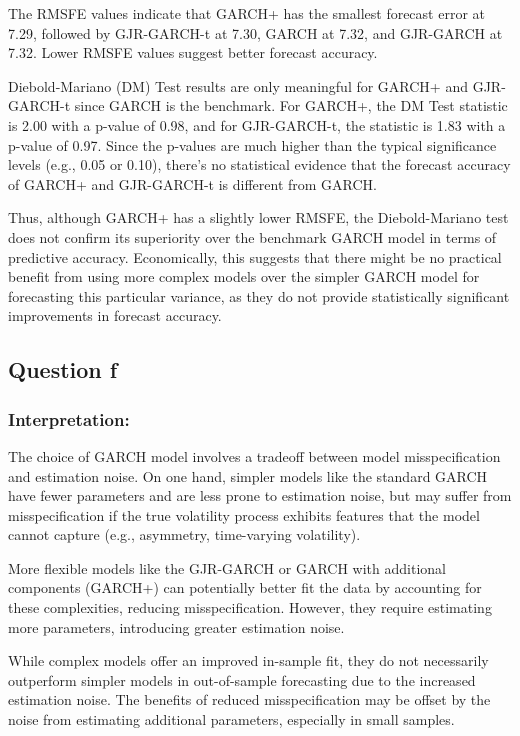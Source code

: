 \documentclass{article}
\begin{document}
The RMSFE values indicate that GARCH+ has the smallest forecast error at 7.29, followed by GJR-GARCH-t at 7.30, GARCH at 7.32, and GJR-GARCH at 7.32. Lower RMSFE values suggest better forecast accuracy.

Diebold-Mariano (DM) Test results are only meaningful for GARCH+ and GJR-GARCH-t since GARCH is the benchmark. For GARCH+, the DM Test statistic is 2.00 with a p-value of 0.98, and for GJR-GARCH-t, the statistic is 1.83 with a p-value of 0.97. Since the p-values are much higher than the typical significance levels (e.g., 0.05 or 0.10), there's no statistical evidence that the forecast accuracy of GARCH+ and GJR-GARCH-t is different from GARCH.

Thus, although GARCH+ has a slightly lower RMSFE, the Diebold-Mariano test does not confirm its superiority over the benchmark GARCH model in terms of predictive accuracy. Economically, this suggests that there might be no practical benefit from using more complex models over the simpler GARCH model for forecasting this particular variance, as they do not provide statistically significant improvements in forecast accuracy.

\subsection*{Question f}
\subsubsection*{Interpretation:}

The choice of GARCH model involves a tradeoff between model misspecification and estimation noise. On one hand, simpler models like the standard GARCH have fewer parameters and are less prone to estimation noise, but may suffer from misspecification if the true volatility process exhibits features that the model cannot capture (e.g., asymmetry, time-varying volatility).

More flexible models like the GJR-GARCH or GARCH with additional components (GARCH+) can potentially better fit the data by accounting for these complexities, reducing misspecification. However, they require estimating more parameters, introducing greater estimation noise.

While complex models offer an improved in-sample fit, they do not necessarily outperform simpler models in out-of-sample forecasting due to the increased estimation noise. The benefits of reduced misspecification may be offset by the noise from estimating additional parameters, especially in small samples.
\end{document}
